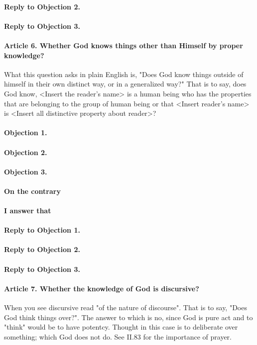 \documentclass{ucetd}
\begin{document}
\paragraph{Reply to Objection 2.}
\paragraph{Reply to Objection 3.}

\paragraph{Article 6. Whether God knows things other than Himself by proper knowledge?}
What this question asks in plain English is, "Does God know things outside of himself in their own distinct way, or in a generalized way?" That is to say, does God know, <Insert the reader's name> is a human being who has the properties that are belonging to the group of human being or that <Insert reader's name> is <Insert all distinctive property about reader>?
\paragraph{Objection 1.}
\paragraph{Objection 2.}
\paragraph{Objection 3.}
\paragraph{On the contrary}
\paragraph{I answer that}
\paragraph{Reply to Objection 1.}
\paragraph{Reply to Objection 2.}
\paragraph{Reply to Objection 3.}

\paragraph{Article 7. Whether the knowledge of God is discursive?}
When you see discursive read "of the nature of discourse". That is to say, "Does God think things over?". The answer to which is no, since God is pure act and to "think" would be to have potentcy. Thought in this case is to deliberate over something; which God does not do. See II.83 for the importance of prayer.
\end{document}

